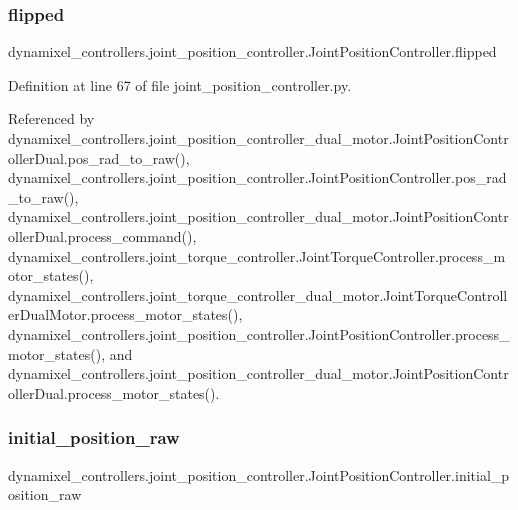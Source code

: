 \subsubsection{\texorpdfstring{flipped}{flipped}}
{\footnotesize\ttfamily dynamixel\+\_\+controllers.\+joint\+\_\+position\+\_\+controller.\+Joint\+Position\+Controller.\+flipped}



Definition at line 67 of file joint\+\_\+position\+\_\+controller.\+py.



Referenced by dynamixel\+\_\+controllers.\+joint\+\_\+position\+\_\+controller\+\_\+dual\+\_\+motor.\+Joint\+Position\+Controller\+Dual.\+pos\+\_\+rad\+\_\+to\+\_\+raw(), dynamixel\+\_\+controllers.\+joint\+\_\+position\+\_\+controller.\+Joint\+Position\+Controller.\+pos\+\_\+rad\+\_\+to\+\_\+raw(), dynamixel\+\_\+controllers.\+joint\+\_\+position\+\_\+controller\+\_\+dual\+\_\+motor.\+Joint\+Position\+Controller\+Dual.\+process\+\_\+command(), dynamixel\+\_\+controllers.\+joint\+\_\+torque\+\_\+controller.\+Joint\+Torque\+Controller.\+process\+\_\+motor\+\_\+states(), dynamixel\+\_\+controllers.\+joint\+\_\+torque\+\_\+controller\+\_\+dual\+\_\+motor.\+Joint\+Torque\+Controller\+Dual\+Motor.\+process\+\_\+motor\+\_\+states(), dynamixel\+\_\+controllers.\+joint\+\_\+position\+\_\+controller.\+Joint\+Position\+Controller.\+process\+\_\+motor\+\_\+states(), and dynamixel\+\_\+controllers.\+joint\+\_\+position\+\_\+controller\+\_\+dual\+\_\+motor.\+Joint\+Position\+Controller\+Dual.\+process\+\_\+motor\+\_\+states().

\mbox{\label{classdynamixel__controllers_1_1joint__position__controller_1_1_joint_position_controller_ab84ae1c2a4880162b67957436895eee7}} 
\subsubsection{\texorpdfstring{initial\+\_\+position\+\_\+raw}{initial\_position\_raw}}
{\footnotesize\ttfamily dynamixel\+\_\+controllers.\+joint\+\_\+position\+\_\+controller.\+Joint\+Position\+Controller.\+initial\+\_\+position\+\_\+raw}



